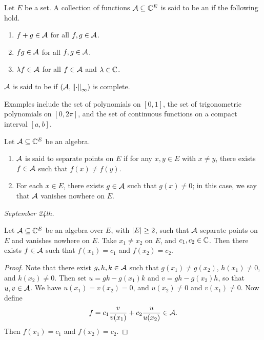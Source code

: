 \begin{definition}    
    Let $E$ be a set. A collection of functions $\mathcal{A} \subseteq \mathbb{C}^{E}$ is said to be an  if the following hold.
    \begin{enumerate}
        \item $f+g \in \mathcal{A}$ for all $f,g \in \mathcal{A}$.
        \item $fg \in \mathcal{A}$ for all $f,g \in \mathcal{A}$.
        \item $\lambda f \in \mathcal{A}$ for all $f \in \mathcal{A}$ and $\lambda \in \mathbb{C}$.
    \end{enumerate}
    $\mathcal{A}$ is said to be  if $(\mathcal{A},\left\lVert\cdot\right\rVert_{\infty})$ is complete.
\end{definition}
Examples include the set of polynomials on $[0,1]$, the set of trigonometric polynomials on $[0,2\pi]$, and the set of continuous functions on a compact interval $[a,b]$.
\begin{definition}
    Let $\mathcal{A} \subseteq \mathbb{C}^{E}$ be an algebra.
    \begin{enumerate}
        \item $\mathcal{A}$ is said to separate points on $E$ if for any $x,y \in E$ with $x \neq y$, there exists $f \in \mathcal{A}$ such that $f(x) \neq f(y)$.
        \item For each $x \in E$, there exists $g \in \mathcal{A}$ such that $g(x) \neq 0$; in this case, we say that $\mathcal{A}$ vanishes nowhere on $E$.
    \end{enumerate}
\end{definition}

\textit{September 24th.}

\begin{theorem}
    Let $\mathcal{A} \subseteq \mathbb{C}^{E}$ be an algebra over $E$, with $\left| E \right| \geq 2$, such that $\mathcal{A}$ separate points on $E$ and vanishes nowhere on $E$. Take $x_{1} \neq x_{2}$ on $E$, and $c_{1},c_{2} \in \mathbb{C}$. Then there exists $f \in \mathcal{A}$ such that $f(x_{1}) = c_{1}$ and $f(x_{2}) = c_{2}$.
\end{theorem}
\begin{proof}
    Note that there exist $g,h,k \in \mathcal{A}$ such that $g(x_{1}) \neq g(x_{2})$, $h(x_{1}) \neq 0$, and $k(x_{2}) \neq 0$. Then set $u = gk-g(x_{1})k$ and $v = gh-g(x_{2})h$, so that $u,v \in \mathcal{A}$. We have $u(x_{1}) = v(x_{2}) = 0$, and $u(x_{2}) \neq 0$ and $v(x_{1}) \neq 0$. Now define
    \begin{align}
        f = c_{1}\frac{v}{v(x_{1})} + c_{2}\frac{u}{u(x_{2})} \in \mathcal{A}.
    \end{align}
    Then $f(x_{1}) = c_{1}$ and $f(x_{2}) = c_{2}$.
\end{proof}

